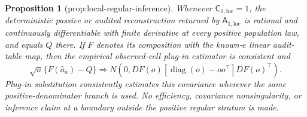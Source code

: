 \documentclass{article}
\newtheorem{proposition}{Proposition}
\begin{document}
\begin{proposition}[prop:local-regular-inference]\label{prop:local-regular-inference}
Whenever \(\mathsf C_{1,\mathrm{loc}}=1\), the deterministic passive or audited reconstruction returned by \(\mathsf A_{1,\mathrm{loc}}\) is rational and continuously differentiable with finite derivative at every positive population law, and equals \(Q\) there.  If \(F\) denotes its composition with the known-\(e\) linear audit-table map, then the empirical observed-cell plug-in estimator is consistent and
\[
\sqrt n\{F(\widehat o_n)-Q\}
\Rightarrow
N\!\left(0,DF(o)[\operatorname{diag}(o)-oo^\top]DF(o)^\top\right).
\]
Plug-in substitution consistently estimates this covariance wherever the same positive-denominator branch is used.  No efficiency, covariance nonsingularity, or inference claim at a boundary outside the positive regular stratum is made.
\end{proposition}
\end{document}
